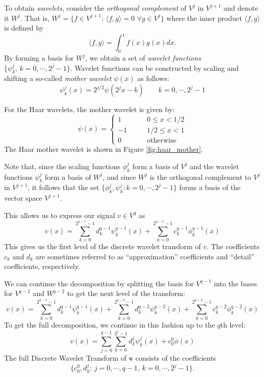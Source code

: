 To obtain \emph{wavelets}, consider the \emph{orthogonal complement} of $V^j$ in $V^{j+1}$ and denote it $W^j$. 
That is, $W^j = \{f \in V^{j+1} :\, \langle f,g\rangle = 0\,\, \forall g \in V^j\}$ where the inner product $\langle f,g\rangle$ is defined by
\begin{equation*}
  \langle f,g\rangle = \int_0^1f(x)g(x)dx.
\end{equation*}
By forming a basis for $W^j$, we obtain a set of \emph{wavelet functions} $\{\psi_k^j,\, k=0,\cdots,2^j-1\}$.
Wavelet functions can be constructed by scaling and shifting a so-called \emph{mother wavelet} $\psi(x)$ as follows:
\begin{equation}
  \label{eqn:haar_wavelet_basis}
  \psi_k^j(x) = 2^{j/2}\psi(2^j x - k) \qquad k = 0,\cdots, 2^j-1
\end{equation}

For the Haar wavelets, the mother wavelet is given by:
\begin{equation}
\label{eqn:haar_mother}
  \psi(x) = \left\{\begin{array}{rl}
  1&\qquad 0 \leq x < 1/2\\
  -1&\qquad 1/2 \leq x < 1\\
  0&\qquad\mbox{otherwise}
  \end{array}\right.
\end{equation}
The Haar mother wavelet is shown in Figure \ref{fig:haar_mother}.

Note that, since the scaling functions $\phi_k^j$ form a basis of $V^j$ and the wavelet functions $\psi_k^j$ form a basis of $W^j$, and since $W^j$ is the orthogonal complement to $V^j$ in $V^{j+1}$, it follows that the set $\{\phi_k^j, \psi_k^j: k=0,\cdots,2^j-1\}$ forms a basis of the vector space $V^{j+1}$.

This allows us to express our signal $v \in V^q$ as 
\begin{equation*}
  v(x) = \sum_{k=0}^{2^{q-1}-1} d_k^{q-1}\psi_k^{q-1}(x) + \sum_{k=0}^{2^{q-1}-1} c_k^{q-1}\phi_k^{q-1}(x)
\end{equation*}
This gives us the first level of the discrete wavelet transform of $v$.
The coefficients $c_k$ and $d_k$ are sometimes referred to as ``approximation'' coefficients and ``detail'' coefficients, respectively.

We can continue the decomposition by splitting the basis for $V^{q-1}$ into the bases for $V^{q-2}$ and $W^{q-2}$ to get the next level of the transform:
\begin{equation*}
  v(x) = \sum_{k=0}^{2^{q-1}-1} d_k^{q-1}\psi_k^{q-1}(x) + \sum_{k=0}^{2^{q-2}-1} d_k^{q-2}\psi_k^{q-2}(x) + \sum_{k=0}^{2^{q-2}-1} c_k^{q-2}\phi_k^{q-2}(x)
\end{equation*}
To get the full decomposition, we continue in this fashion up to the $q$th level:
\begin{equation*}
  v(x) = \sum_{j=0}^{q-1} \sum_{k=0}^{2^j-1} d_k^{j} \psi_k^j(x) + c_0^0\phi(x)
\end{equation*}
The full Discrete Wavelet Transform of $\bm v$ consists of the coefficients
\begin{equation*}
  \{c_0^0, d_k^j:\,j=0,\cdots,q-1, \, k=0,\cdots,2^j-1\}.
\end{equation*}


